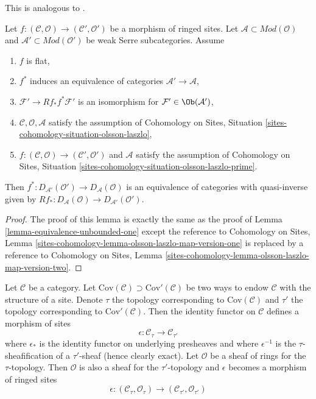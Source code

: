 \begin{lemma}
\label{lemma-equivalence-unbounded-two}
\begin{reference}
This is analogous to \cite[Theorem 2.2.3]{six-I}.
\end{reference}
Let $f : (\mathcal{C}, \mathcal{O}) \to (\mathcal{C}', \mathcal{O}')$
be a morphism of ringed sites.
Let $\mathcal{A} \subset \textit{Mod}(\mathcal{O})$
and $\mathcal{A}' \subset \textit{Mod}(\mathcal{O}')$
be weak Serre subcategories. Assume
\begin{enumerate}
\item $f$ is flat,
\item $f^*$ induces an equivalence of categories
$\mathcal{A}' \to \mathcal{A}$,
\item $\mathcal{F}' \to Rf_*f^*\mathcal{F}'$ is an isomorphism
for $\mathcal{F}' \in \Ob(\mathcal{A}')$,
\item $\mathcal{C}, \mathcal{O}, \mathcal{A}$ satisfy the
assumption of
Cohomology on Sites, Situation \ref{sites-cohomology-situation-olsson-laszlo},
\item $f : (\mathcal{C}, \mathcal{O}) \to (\mathcal{C}', \mathcal{O}')$
and $\mathcal{A}$ satisfy the assumption of
Cohomology on Sites, Situation
\ref{sites-cohomology-situation-olsson-laszlo-prime}.
\end{enumerate}
Then $f^* : D_{\mathcal{A}'}(\mathcal{O}') \to D_\mathcal{A}(\mathcal{O})$
is an equivalence of categories with quasi-inverse given by
$Rf_* : D_\mathcal{A}(\mathcal{O}) \to D_{\mathcal{A}'}(\mathcal{O}')$.
\end{lemma}

\begin{proof}
The proof of this lemma is exactly the same as the proof
of Lemma \ref{lemma-equivalence-unbounded-one}
except the reference to
Cohomology on Sites, Lemma
\ref{sites-cohomology-lemma-olsson-laszlo-map-version-one}
is replaced by a reference to
Cohomology on Sites, Lemma
\ref{sites-cohomology-lemma-olsson-laszlo-map-version-two}.
\end{proof}


\noindent
Let $\mathcal{C}$ be a category. Let
$\text{Cov}(\mathcal{C}) \supset \text{Cov}'(\mathcal{C})$
be two ways to endow $\mathcal{C}$ with the structure of a site.
Denote $\tau$ the topology corresponding to $\text{Cov}(\mathcal{C})$
and $\tau'$ the topology corresponding to $\text{Cov}'(\mathcal{C})$.
Then the identity functor on $\mathcal{C}$ defines a morphism
of sites
$$
\epsilon : \mathcal{C}_\tau \longrightarrow \mathcal{C}_{\tau'}
$$
where $\epsilon_*$ is the identity functor on underlying presheaves and
where $\epsilon^{-1}$ is the $\tau$-sheafification of a $\tau'$-sheaf
(hence clearly exact). Let $\mathcal{O}$ be a sheaf of rings for the
$\tau$-topology. Then $\mathcal{O}$ is also a sheaf for the $\tau'$-topology
and $\epsilon$ becomes a morphism of ringed sites
$$
\epsilon :
(\mathcal{C}_\tau, \mathcal{O}_\tau)
\longrightarrow
(\mathcal{C}_{\tau'}, \mathcal{O}_{\tau'})
$$

